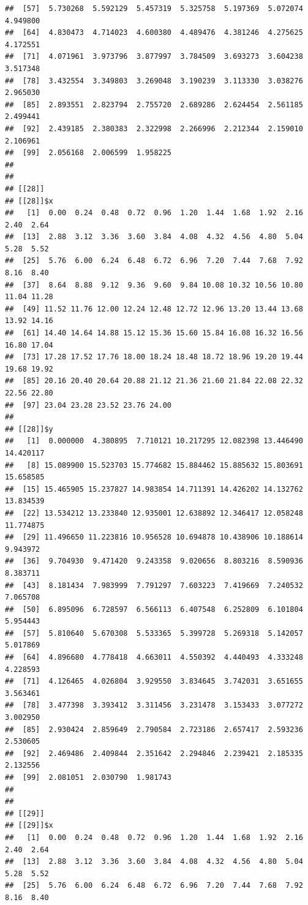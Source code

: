 \documentclass[
  ignorenonframetext,
]{beamer}
\begin{document}
\begin{frame}[fragile]{}
\begin{verbatim}
##  [57]  5.730268  5.592129  5.457319  5.325758  5.197369  5.072074  4.949800
##  [64]  4.830473  4.714023  4.600380  4.489476  4.381246  4.275625  4.172551
##  [71]  4.071961  3.973796  3.877997  3.784509  3.693273  3.604238  3.517348
##  [78]  3.432554  3.349803  3.269048  3.190239  3.113330  3.038276  2.965030
##  [85]  2.893551  2.823794  2.755720  2.689286  2.624454  2.561185  2.499441
##  [92]  2.439185  2.380383  2.322998  2.266996  2.212344  2.159010  2.106961
##  [99]  2.056168  2.006599  1.958225
## 
## 
## [[28]]
## [[28]]$x
##   [1]  0.00  0.24  0.48  0.72  0.96  1.20  1.44  1.68  1.92  2.16  2.40  2.64
##  [13]  2.88  3.12  3.36  3.60  3.84  4.08  4.32  4.56  4.80  5.04  5.28  5.52
##  [25]  5.76  6.00  6.24  6.48  6.72  6.96  7.20  7.44  7.68  7.92  8.16  8.40
##  [37]  8.64  8.88  9.12  9.36  9.60  9.84 10.08 10.32 10.56 10.80 11.04 11.28
##  [49] 11.52 11.76 12.00 12.24 12.48 12.72 12.96 13.20 13.44 13.68 13.92 14.16
##  [61] 14.40 14.64 14.88 15.12 15.36 15.60 15.84 16.08 16.32 16.56 16.80 17.04
##  [73] 17.28 17.52 17.76 18.00 18.24 18.48 18.72 18.96 19.20 19.44 19.68 19.92
##  [85] 20.16 20.40 20.64 20.88 21.12 21.36 21.60 21.84 22.08 22.32 22.56 22.80
##  [97] 23.04 23.28 23.52 23.76 24.00
## 
## [[28]]$y
##   [1]  0.000000  4.380895  7.710121 10.217295 12.082398 13.446490 14.420117
##   [8] 15.089900 15.523703 15.774682 15.884462 15.885632 15.803691 15.658585
##  [15] 15.465905 15.237827 14.983854 14.711391 14.426202 14.132762 13.834539
##  [22] 13.534212 13.233840 12.935001 12.638892 12.346417 12.058248 11.774875
##  [29] 11.496650 11.223816 10.956528 10.694878 10.438906 10.188614  9.943972
##  [36]  9.704930  9.471420  9.243358  9.020656  8.803216  8.590936  8.383711
##  [43]  8.181434  7.983999  7.791297  7.603223  7.419669  7.240532  7.065708
##  [50]  6.895096  6.728597  6.566113  6.407548  6.252809  6.101804  5.954443
##  [57]  5.810640  5.670308  5.533365  5.399728  5.269318  5.142057  5.017869
##  [64]  4.896680  4.778418  4.663011  4.550392  4.440493  4.333248  4.228593
##  [71]  4.126465  4.026804  3.929550  3.834645  3.742031  3.651655  3.563461
##  [78]  3.477398  3.393412  3.311456  3.231478  3.153433  3.077272  3.002950
##  [85]  2.930424  2.859649  2.790584  2.723186  2.657417  2.593236  2.530605
##  [92]  2.469486  2.409844  2.351642  2.294846  2.239421  2.185335  2.132556
##  [99]  2.081051  2.030790  1.981743
## 
## 
## [[29]]
## [[29]]$x
##   [1]  0.00  0.24  0.48  0.72  0.96  1.20  1.44  1.68  1.92  2.16  2.40  2.64
##  [13]  2.88  3.12  3.36  3.60  3.84  4.08  4.32  4.56  4.80  5.04  5.28  5.52
##  [25]  5.76  6.00  6.24  6.48  6.72  6.96  7.20  7.44  7.68  7.92  8.16  8.40

\end{verbatim}
\end{frame}
\end{document}
